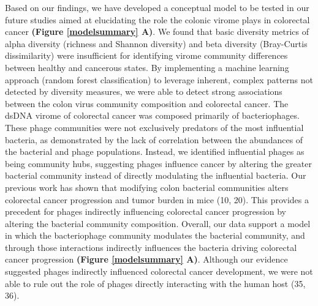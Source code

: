 \documentclass[12pt,]{article}
\begin{document}
Based on our findings, we have developed a conceptual model to be tested
in our future studies aimed at elucidating the role the colonic virome
plays in colorectal cancer \textbf{(Figure \ref{modelsummary} A)}. We
found that basic diversity metrics of alpha diversity (richness and
Shannon diversity) and beta diversity (Bray-Curtis dissimilarity) were
insufficient for identifying virome community differences between
healthy and cancerous states. By implementing a machine learning
approach (random forest classification) to leverage inherent, complex
patterns not detected by diversity measures, we were able to detect
strong associations between the colon virus community composition and
colorectal cancer. The dsDNA virome of colorectal cancer was composed
primarily of bacteriophages. These phage communities were not
exclusively predators of the most influential bacteria, as demonstrated
by the lack of correlation between the abundances of the bacterial and
phage populations. Instead, we identified influential phages as being
community hubs, suggesting phages influence cancer by altering the
greater bacterial community instead of directly modulating the
influential bacteria. Our previous work has shown that modifying colon
bacterial communities alters colorectal cancer progression and tumor
burden in mice (10, 20). This provides a precedent for phages indirectly
influencing colorectal cancer progression by altering the bacterial
community composition. Overall, our data support a model in which the
bacteriophage community modulates the bacterial community, and through
those interactions indirectly influences the bacteria driving colorectal
cancer progression \textbf{(Figure \ref{modelsummary} A)}. Although our
evidence suggested phages indirectly influenced colorectal cancer
development, we were not able to rule out the role of phages directly
interacting with the human host (35, 36).
\end{document}
